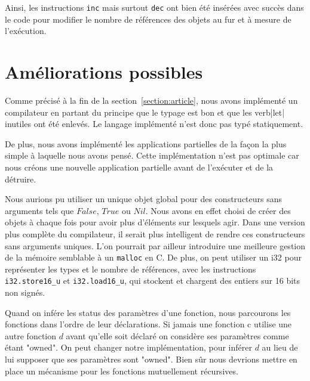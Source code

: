 \documentclass{rapportECL}
\begin{document}
Ainsi, les instructions \verb|inc| mais surtout \verb|dec| ont bien été insérées avec succès dans le code pour modifier le nombre de références des objets au fur et à mesure de l'exécution.

\section{Améliorations possibles}

Comme précisé à la fin de la section~\ref{section:article}, nous avons implémenté un compilateur en partant du principe que le 
typage est bon et que les verb|let| inutiles ont été enlevés. Le langage implémenté n'est donc pas typé statiquement.

De plus, nous avons implémenté les applications partielles de la façon la plus simple à laquelle nous avons pensé. 
Cette implémentation n'est pas optimale car nous créons une nouvelle application partielle avant de l'exécuter et de la détruire.

Nous aurions pu utiliser un unique objet global pour des constructeurs sans arguments tels que $False$, $True$ ou $Nil$. 
Nous avons en effet choisi de créer des objets à chaque fois pour avoir plus d'éléments sur lesquels agir. Dans une 
version plus complète du compilateur, il serait plus intelligent de rendre ces constructeurs sans arguments uniques. L'on 
pourrait par ailleur introduire une meilleure gestion de la mémoire semblable à un \verb|malloc| en C. De plus, on peut 
utiliser un i32 pour représenter les types et le nombre de références, avec les instructions \verb|i32.store16_u| et \verb|i32.load16_u|, qui stockent et chargent des entiers sur 16 bits non signés.

Quand on infére les status des paramètres d'une fonction, nous parcourons les fonctions dans l'ordre de leur déclarations. 
Si jamais une fonction c utilise une autre fonction $d$ avant qu'elle soit déclaré on considère ses paramètres comme étant "owned".
On peut changer notre implémentation, pour inférer $d$ au lieu de lui supposer que ses paramètres sont "owned".
Bien sûr nous devrions mettre en place un mécanisme pour les fonctions mutuellement récursives.


\newpage

\printbibliography
\end{document}
